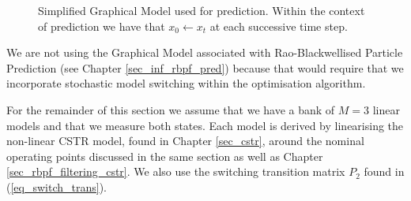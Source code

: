 \begin{figure}[H] 
\centering
{}
\caption{Simplified Graphical Model used for prediction. Within the context of prediction we have that $x_0 \leftarrow x_t$ at each successive time step.}
\label{fig_gm_prediction}
\end{figure}
We are not using the Graphical Model associated with Rao-Blackwellised Particle Prediction (see Chapter \ref{sec_inf_rbpf_pred}) because that would require that we incorporate stochastic model switching within the optimisation algorithm. 

For the remainder of this section we assume that we have a bank of $M=3$ linear models and that we measure both states. Each model is derived by linearising the non-linear CSTR model, found in Chapter \ref{sec_cstr}, around the nominal operating points discussed in the same section as well as Chapter \ref{sec_rbpf_filtering_cstr}. We also use the switching transition matrix $P_2$ found in (\ref{eq_switch_trans}).
